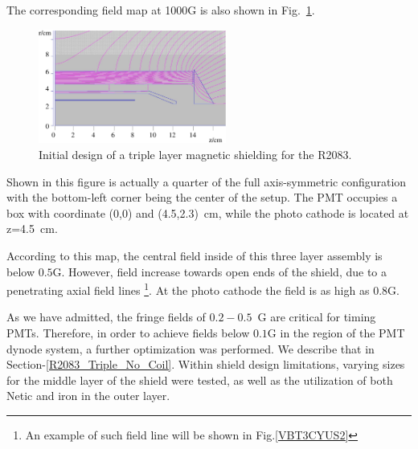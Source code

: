 \documentclass[12pt]{article}
\begin{document}
The corresponding field map at 1000G is  also shown  in Fig.~\ref{R2083_Initial}. 
%
\begin{figure}[htbp]
\centering
\includegraphics[width=0.55\textwidth]{R2083_NETIC_hiperm49_CONETIC_standardDesign.eps}
\caption{\small{Initial design of a triple layer magnetic shielding for the R2083.}}
\label{R2083_Initial}
\end{figure}
%
Shown in this figure is actually  a quarter of the full axis-symmetric configuration
with the bottom-left corner being the center of the setup. 
The PMT  occupies a box with coordinate (0,0) and (4.5,2.3)~cm,  while the  photo 
cathode is located at  z=4.5~cm. 

According to this map, the central  field  inside of this  three layer assembly 
is  below $0.5$G. 
However, field  increase towards open ends of the shield, due to a
penetrating  axial field lines
\footnote{An example of such  field line will be shown  in Fig.\ref{VBT3CYUS2}}. 
At the photo cathode the field  is as high as  $0.8$G.  

As we have admitted,  the fringe  fields  of $0.2-0.5$~G are 
critical  for  timing PMTs. Therefore, in order to achieve fields  below $0.1$G in 
the region of the PMT dynode system, a further optimization was performed.  
We describe that  in  Section-\ref{R2083_Triple_No_Coil}.  
Within shield design limitations, varying sizes 
for the middle layer of the shield were tested, as well as the utilization of both Netic and 
iron in the outer layer.
\end{document}

